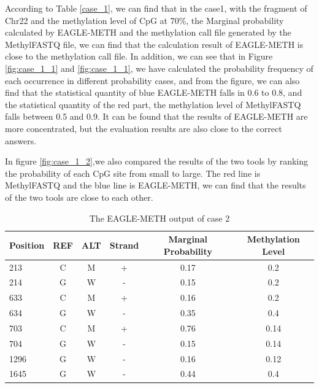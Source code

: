 \documentclass{PHlab-thesis}
\begin{document}
\par According to Table \ref{case_1}, we can find that in the case1, with the fragment of Chr22 and the methylation level of CpG at 70\%, the Marginal probability calculated by EAGLE-METH and the methylation call file generated by the MethylFASTQ file, we can find that the calculation result of EAGLE-METH is close to the methylation call file.
In addition, we can see that in Figure \ref{fig:case_1_1} and \ref{fig:case_1_1}, we have calculated the probability frequency of each occurrence in different probability cases, and from the figure, we can also find that the statistical quantity of blue EAGLE-METH falls in 0.6 to 0.8, and the statistical quantity of the red part, the methylation level of MethylFASTQ falls between 0.5 and 0.9. It can be found that the results of EAGLE-METH are more concentrated, but the evaluation results are also close to the correct answers.
\par In figure \ref{fig:case_1_2},we also compared the results of the two tools by ranking the probability of each CpG site from small to large. The red line is MethylFASTQ and the blue line is EAGLE-METH, we can find that the results of the two tools are close to each other.
\vspace{15mm}
\begin{table}[h!]
	\centering
	\begin{tabular}{l*{5}{c}}
		Position    & REF & ALT & Strand & Marginal Probability & Methylation Level\\
		\hline
		213  & C & M & + & 0.17 & 0.2  \\
		214 & G & W & - & 0.15 & 0.2  \\
		633 & C & M & + & 0.16 & 0.2  \\
		634 & G & W & - & 0.35 & 0.4  \\
		703 & C & M & + & 0.76 & 0.14  \\
    704 & G & W & - & 0.15 & 0.14  \\
		1296 & G & W & - & 0.16 & 0.12  \\
    1645 & G & W & - & 0.44 & 0.4  \\
	\end{tabular}
	\caption{The EAGLE-METH output of case 2}
	\label{case2}
\end{table}
\end{document}
